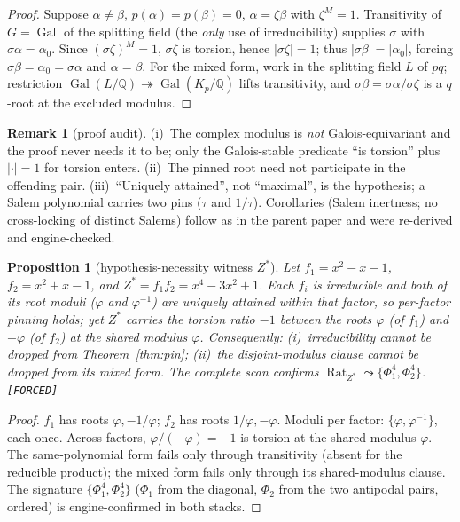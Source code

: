 \documentclass[11pt]{article}
\newcommand{\F}{\textnormal{\texttt{[FORCED]}}}
\newcommand{\Q}{\mathbb{Q}}
\newcommand{\Rat}{\operatorname{Rat}}
\newcommand{\Gal}{\operatorname{Gal}}
\newtheorem{proposition}[theorem]{Proposition}
\theoremstyle{definition}
\newtheorem{remark}[theorem]{Remark}
\begin{document}
\begin{proof}
Suppose $\alpha\neq\beta$, $p(\alpha)=p(\beta)=0$, $\alpha=\zeta\beta$ with
$\zeta^M=1$. Transitivity of $G=\Gal$ of the splitting field (the \emph{only}
use of irreducibility) supplies $\sigma$ with $\sigma\alpha=\alpha_0$. Since
$(\sigma\zeta)^M=1$, $\sigma\zeta$ is torsion, hence $|\sigma\zeta|=1$; thus
$|\sigma\beta|=|\alpha_0|$, forcing $\sigma\beta=\alpha_0=\sigma\alpha$ and
$\alpha=\beta$. For the mixed form, work in the splitting field $L$ of $pq$;
restriction $\Gal(L/\Q)\twoheadrightarrow\Gal(K_p/\Q)$ lifts transitivity, and
$\sigma\beta=\sigma\alpha/\sigma\zeta$ is a $q$-root at the excluded modulus.
\end{proof}

\begin{remark}[proof audit]\label{rem:audit}
(i)~The complex modulus is \emph{not} Galois-equivariant and the proof never
needs it to be; only the Galois-stable predicate ``is torsion'' plus $|{\cdot}|=1$
for torsion enters. (ii)~The pinned root need not participate in the offending
pair. (iii)~``Uniquely attained'', not ``maximal'', is the hypothesis; a Salem
polynomial carries two pins ($\tau$ and $1/\tau$). Corollaries
\cite[7.14, 7.15]{relcharge} (Salem inertness; no cross-locking of distinct
Salems) follow as in the parent paper and were re-derived and engine-checked.
\end{remark}

\begin{proposition}[hypothesis-necessity witness $Z^{*}$]\label{prop:zstar}
Let $f_1=x^2-x-1$, $f_2=x^2+x-1$, and
$Z^{*}=f_1f_2=x^4-3x^2+1$. Each $f_i$ is irreducible and \emph{both} of its
root moduli ($\varphi$ and $\varphi^{-1}$) are uniquely attained within that
factor, so per-factor pinning holds; yet $Z^{*}$ carries the torsion ratio $-1$
between the roots $\varphi$ (of $f_1$) and $-\varphi$ (of $f_2$) at the shared
modulus $\varphi$. Consequently: (i)~irreducibility cannot be dropped from
Theorem~\ref{thm:pin}; (ii)~the disjoint-modulus clause cannot be dropped from
its mixed form. The complete scan confirms
$\Rat_{Z^{*}}\leadsto\{\Phi_1^4,\Phi_2^4\}$. \F
\end{proposition}

\begin{proof}
$f_1$ has roots $\varphi,-1/\varphi$; $f_2$ has roots $1/\varphi,-\varphi$.
Moduli per factor: $\{\varphi,\varphi^{-1}\}$, each once. Across factors,
$\varphi/(-\varphi)=-1$ is torsion at the shared modulus $\varphi$. The
same-polynomial form fails only through transitivity (absent for the reducible
product); the mixed form fails only through its shared-modulus clause. The
signature $\{\Phi_1^4,\Phi_2^4\}$ ($\Phi_1$ from the diagonal, $\Phi_2$ from the
two antipodal pairs, ordered) is engine-confirmed in both stacks.
\end{proof}
\end{document}

